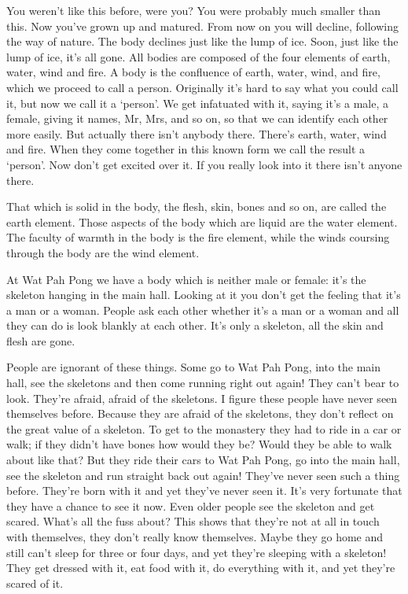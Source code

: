 You weren't like this before, were you? You were probably much smaller than this. Now you've grown up and matured. From now on you will decline, following the way of nature. The body declines just like the lump of ice. Soon, just like the lump of ice, it's all gone. All bodies are composed of the four elements of earth, water, wind and fire. A body is the confluence of earth, water, wind, and fire, which we proceed to call a person. Originally it's hard to say what you could call it, but now we call it a `person'. We get infatuated with it, saying it's a male, a female, giving it names, Mr, Mrs, and so on, so that we can identify each other more easily. But actually there isn't anybody there. There's earth, water, wind and fire. When they come together in this known form we call the result a `person'. Now don't get excited over it. If you really look into it there isn't anyone there.

That which is solid in the body, the flesh, skin, bones and so on, are called the earth element. Those aspects of the body which are liquid are the water element. The faculty of warmth in the body is the fire element, while the winds coursing through the body are the wind element.

At Wat Pah Pong we have a body which is neither male or female: it's the skeleton hanging in the main hall. Looking at it you don't get the feeling that it's a man or a woman. People ask each other whether it's a man or a woman and all they can do is look blankly at each other. It's only a skeleton, all the skin and flesh are gone.

People are ignorant of these things. Some go to Wat Pah Pong, into the main hall, see the skeletons and then come running right out again! They can't bear to look. They're afraid, afraid of the skeletons. I figure these people have never seen themselves before. Because they are afraid of the skeletons, they don't reflect on the great value of a skeleton. To get to the monastery they had to ride in a car or walk; if they didn't have bones how would they be? Would they be able to walk about like that? But they ride their cars to Wat Pah Pong, go into the main hall, see the skeleton and run straight back out again! They've never seen such a thing before. They're born with it and yet they've never seen it. It's very fortunate that they have a chance to see it now. Even older people see the skeleton and get scared. What's all the fuss about? This shows that they're not at all in touch with themselves, they don't really know themselves. Maybe they go home and still can't sleep for three or four days, and yet they're sleeping with a skeleton! They get dressed with it, eat food with it, do everything with it, and yet they're scared of it.

